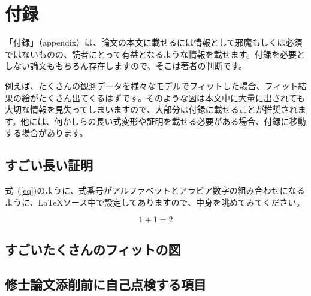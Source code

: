 \chapter*{付録} %

「付録」（appendix）は、論文の本文に載せるには情報として邪魔もしくは必須ではないものの、読者にとって有益となるような情報を載せます。付録を必要としない論文ももちろん存在しますので、そこは著者の判断です。

例えば、たくさんの観測データを様々なモデルでフィットした場合、フィット結果の絵がたくさん出てくるはずです。そのような図は本文中に大量に出されても大切な情報を見失ってしまいますので、大部分は付録に載せることが推奨されます。他には、何かしらの長い式変形や証明を載せる必要がある場合、付録に移動する場合があります。

\setcounter{section}{0} %
\renewcommand{\thesection}{\Alph{section}} %
\setcounter{equation}{0} %
\renewcommand{\theequation}{\Alph{section}.\arabic{equation}}
\setcounter{figure}{0} %
\renewcommand{\thefigure}{\Alph{section}.\arabic{figure}}
\setcounter{table}{0} %
\renewcommand{\thetable}{\Alph{section}.\arabic{table}}

\section{すごい長い証明}
式~(\ref{eq})のように、式番号がアルファベットとアラビア数字の組み合わせになるように、\LaTeX{}ソース中で設定してありますので、中身を眺めてみてください。

\begin{equation}
  \label{eq}
  1 + 1 = 2
\end{equation}


\section{すごいたくさんのフィットの図}

\section{修士論文添削前に自己点検する項目}


